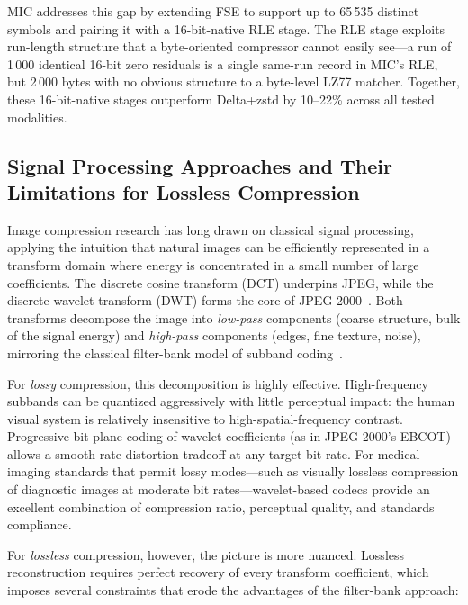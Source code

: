 \documentclass[11pt,twocolumn]{article}
\begin{document}
MIC addresses this gap by extending FSE to support up to 65\,535 distinct symbols and pairing it with a 16-bit-native RLE stage.
The RLE stage exploits run-length structure that a byte-oriented compressor cannot easily see---a run of 1\,000 identical 16-bit zero residuals is a single same-run record in MIC's RLE, but 2\,000 bytes with no obvious structure to a byte-level LZ77 matcher.
Together, these 16-bit-native stages outperform Delta+zstd by 10--22\% across all tested modalities.

\subsection{Signal Processing Approaches and Their Limitations for Lossless Compression}
\label{sec:related_sigproc}

Image compression research has long drawn on classical signal processing, applying the intuition that natural images can be efficiently represented in a transform domain where energy is concentrated in a small number of large coefficients.
The discrete cosine transform (DCT) underpins JPEG, while the discrete wavelet transform (DWT) forms the core of JPEG 2000~\cite{jpeg2000}.
Both transforms decompose the image into \emph{low-pass} components (coarse structure, bulk of the signal energy) and \emph{high-pass} components (edges, fine texture, noise), mirroring the classical filter-bank model of subband coding~\cite{legall1988}.

For \emph{lossy} compression, this decomposition is highly effective.
High-frequency subbands can be quantized aggressively with little perceptual impact: the human visual system is relatively insensitive to high-spatial-frequency contrast.
Progressive bit-plane coding of wavelet coefficients (as in JPEG 2000's EBCOT) allows a smooth rate-distortion tradeoff at any target bit rate.
For medical imaging standards that permit lossy modes---such as visually lossless compression of diagnostic images at moderate bit rates---wavelet-based codecs provide an excellent combination of compression ratio, perceptual quality, and standards compliance.

For \emph{lossless} compression, however, the picture is more nuanced.
Lossless reconstruction requires perfect recovery of every transform coefficient, which imposes several constraints that erode the advantages of the filter-bank approach:
\end{document}
